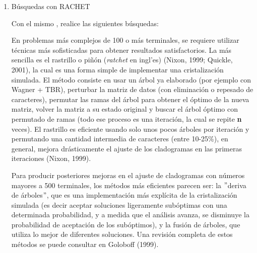 \begin{itemize}
\begin{enumerate}
	\item{B\'usquedas con RACHET}

	Con el mismo , realice las siguientes b\'usquedas:

 \begin{table}[H]
 \centering
 \end{table}

En problemas m\'as complejos de 100 o m\'as terminales, se requiere utilizar t\'ecnicas m\'as sofisticadas para obtener resultados satisfactorios. La m\'as sencilla es el rastrillo o pi\~n\'on (\textit{ratchet} en ingl'es) {\color{red}(Nixon,  1999; Quickle,  2001)},  la cual es una forma simple de implementar una cristalizaci\'on simulada. El m\'etodo consiste en usar un \'arbol ya elaborado (por ejemplo con Wagner + TBR),  perturbar la matriz de datos (con eliminaci\'on o repesado de caracteres), permutar las ramas del \'arbol para obtener el \'optimo de la nueva matriz,  volver la matriz a su estado original y buscar el \'arbol \'optimo con permutado de ramas (todo ese proceso es una iteraci\'on,  la cual se repite \textbf{n} veces). El rastrillo es eficiente usando solo unos pocos \'arboles por iteraci\'on y permutando una cantidad intermedia de caracteres (entre 10-25\%), en general, mejora dr\'asticamente el ajuste de los cladogramas en las primeras iteraciones (Nixon,  1999).
 
Para producir posteriores mejoras en el ajuste de cladogramas con n\'umeros mayores a 500 terminales,  los m\'etodos m\'as eficientes parecen ser: la $"$deriva de \'arboles$"$,  que es una implementaci\'on m\'as expl\'icita de la cristalizaci\'on simulada (es decir aceptar soluciones ligeramente sub\'optimas con una determinada probabilidad,  y a medida que el an\'alisis avanza,  se disminuye la probabilidad de aceptaci\'on de los sub\'optimos), y la fusi\'on de \'arboles,  que utiliza lo mejor de diferentes soluciones. Una revisi\'on completa de estos m\'etodos se puede consultar en {\color{red} Goloboff (1999)}.
  

\end{enumerate}
\end{itemize}
